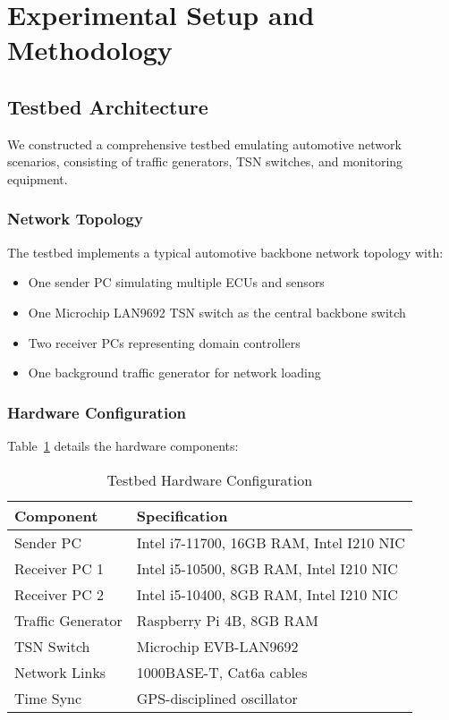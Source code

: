\documentclass[10pt, journal, compsoc]{IEEEtran}
\begin{document}
\section{Experimental Setup and Methodology}
\label{sec:experimental_setup}

\subsection{Testbed Architecture}

We constructed a comprehensive testbed emulating automotive network scenarios, consisting of traffic generators, TSN switches, and monitoring equipment.

\subsubsection{Network Topology}

The testbed implements a typical automotive backbone network topology with:
\begin{itemize}
    \item One sender PC simulating multiple ECUs and sensors
    \item One Microchip LAN9692 TSN switch as the central backbone switch
    \item Two receiver PCs representing domain controllers
    \item One background traffic generator for network loading
\end{itemize}

\subsubsection{Hardware Configuration}

Table~\ref{tab:hardware_config} details the hardware components:

\begin{table}[h]
\centering
\caption{Testbed Hardware Configuration}
\label{tab:hardware_config}
\begin{tabular}{ll}
\toprule
\textbf{Component} & \textbf{Specification} \\
\midrule
Sender PC & Intel i7-11700, 16GB RAM, Intel I210 NIC \\
Receiver PC 1 & Intel i5-10500, 8GB RAM, Intel I210 NIC \\
Receiver PC 2 & Intel i5-10400, 8GB RAM, Intel I210 NIC \\
Traffic Generator & Raspberry Pi 4B, 8GB RAM \\
TSN Switch & Microchip EVB-LAN9692 \\
Network Links & 1000BASE-T, Cat6a cables \\
Time Sync & GPS-disciplined oscillator \\
\bottomrule
\end{tabular}
\end{table}
\end{document}
